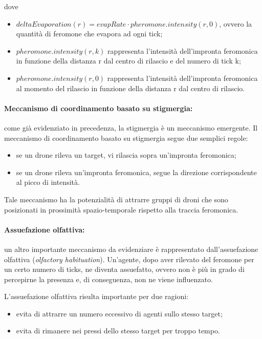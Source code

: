 dove
\begin{itemize}
    \item $deltaEvaporation(r) = evapRate \cdot pheromone.intensity(r,0)$, ovvero la quantità di feromone che evapora ad ogni tick;
    \item $pheromone.intensity(r,k)$ rappresenta l'intensità dell'impronta feromonica in funzione della distanza r dal centro di rilascio e del numero di tick k;
    \item $pheromone.intensity(r,0)$ rappresenta l'intensità dell'impronta feromonica al momento del rilascio in funzione della distanza r dal centro di rilascio.
\end{itemize}

\paragraph{Meccanismo di coordinamento basato su stigmergia:} come già evidenziato in precedenza, la stigmergia è un meccanismo emergente.
Il meccanismo di coordinamento basato su stigmergia segue due semplici regole:
\begin{itemize}
	\item se un drone rileva un target, vi rilascia sopra un’impronta feromonica;
	\item se un drone rileva un’impronta feromonica, segue la direzione corrispondente al picco di intensità. 
\end{itemize}

Tale meccanismo ha la potenzialità di attrarre gruppi di droni che sono posizionati in prossimità spazio-temporale rispetto alla traccia feromonica. 

\paragraph{Assuefazione olfattiva:} un altro importante meccanismo da evidenziare è rappresentato dall’assuefazione olfattiva (\textit{olfactory habituation}). 
Un’agente, dopo aver rilevato del feromone per un certo numero di ticks, ne diventa assuefatto, ovvero non è più in grado di percepirne la presenza e, di conseguenza, non ne viene influenzato. 

L’assuefazione olfattiva risulta importante per due ragioni:
\begin{itemize}
    \item evita di attrarre un numero eccessivo di agenti sullo stesso target;
	\item evita di rimanere nei pressi dello stesso target per troppo tempo.
\end{itemize}

